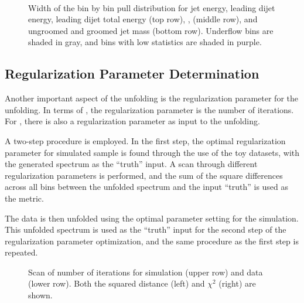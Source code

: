 \begin{figure}[htp!]
    \centering
    \\
    \caption{Width of the bin by bin pull distribution for jet energy, leading dijet energy, leading dijet total energy (top row), \zg, \Rg (middle row), and ungroomed and groomed jet mass (bottom row).  Underflow bins are shaded in gray, and bins with low statistics are shaded in purple.}
    \label{Figure:Unfolding-StatisticsValidation}
\end{figure}


\subsection{Regularization Parameter Determination}

Another important aspect of the unfolding is the regularization parameter for the unfolding.  In terms of \Bayes, the regularization parameter is the number of iterations.  For \SVD, there is also a regularization parameter as input to the unfolding.

A two-step procedure is employed.  In the first step, the optimal regularization parameter for simulated sample is found through the use of the toy datasets, with the generated spectrum as the ``truth'' input.  A scan through different regularization parameters is performed, and the sum of the square differences across all bins between the unfolded spectrum and the input ``truth'' is used as the metric.

The data is then unfolded using the optimal parameter setting for the simulation.  This unfolded spectrum is used as the ``truth'' input for the second step of the regularization parameter optimization, and the same procedure as the first step is repeated.

\begin{figure}[htp!]
    \centering
    \caption{Scan of number of iterations for simulation (upper row) and data (lower row).  Both the squared distance (left) and $\chi^2$ (right) are shown.}
    \label{Figure:Unfolding-IterationScanJetE}
\end{figure}

